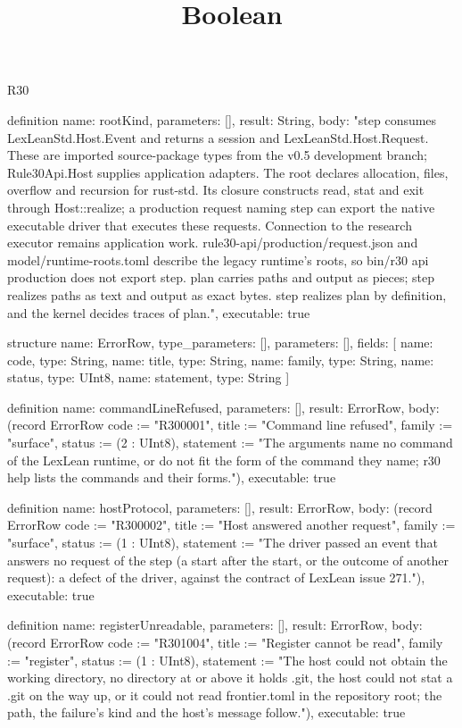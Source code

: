 \begin{lexlean}{R30}
\title{Boolean}
\begin{semanticmodule}
definition{
  name: rootKind,
  parameters: [],
  result: String,
  body: "step consumes LexLeanStd.Host.Event and returns a session and LexLeanStd.Host.Request. These are imported source-package types from the v0.5 development branch; Rule30Api.Host supplies application adapters. The root declares allocation, files, overflow and recursion for rust-std. Its closure constructs read, stat and exit through Host::realize; a production request naming step can export the native executable driver that executes these requests. Connection to the research executor remains application work. rule30-api/production/request.json and model/runtime-roots.toml describe the legacy runtime's roots, so bin/r30 api production does not export step. plan carries paths and output as pieces; step realizes paths as text and output as exact bytes. step realizes plan by definition, and the kernel decides traces of plan.",
  executable: true
}

structure{
  name: ErrorRow,
  type_parameters: [],
  parameters: [],
  fields: [
    {name: code, type: String},
    {name: title, type: String},
    {name: family, type: String},
    {name: status, type: UInt8},
    {name: statement, type: String}
  ]
}

definition{
  name: commandLineRefused,
  parameters: [],
  result: ErrorRow,
  body: (record ErrorRow {code := "R300001", title := "Command line refused", family := "surface", status := (2 : UInt8), statement := "The arguments name no command of the LexLean runtime, or do not fit the form of the command they name; r30 help lists the commands and their forms."}),
  executable: true
}

definition{
  name: hostProtocol,
  parameters: [],
  result: ErrorRow,
  body: (record ErrorRow {code := "R300002", title := "Host answered another request", family := "surface", status := (1 : UInt8), statement := "The driver passed an event that answers no request of the step (a start after the start, or the outcome of another request): a defect of the driver, against the contract of LexLean issue 271."}),
  executable: true
}

definition{
  name: registerUnreadable,
  parameters: [],
  result: ErrorRow,
  body: (record ErrorRow {code := "R301004", title := "Register cannot be read", family := "register", status := (1 : UInt8), statement := "The host could not obtain the working directory, no directory at or above it holds .git, the host could not stat a .git on the way up, or it could not read frontier.toml in the repository root; the path, the failure's kind and the host's message follow."}),
  executable: true
}


\end{semanticmodule}
\end{lexlean}
